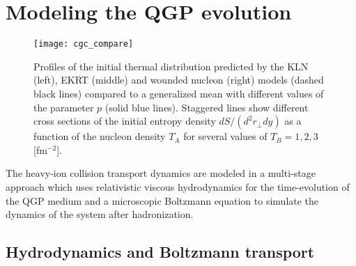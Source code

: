 \documentclass[aps,prc,reprint,amsmath,nofootinbib]{revtex4-1}
\begin{document}
\section{Modeling the QGP evolution}

\begin{figure*}
    \texttt{[image: cgc\_compare]}
    \caption{Profiles of the initial thermal distribution predicted by the KLN (left), EKRT (middle) and wounded nucleon (right) models (dashed black lines) compared to a generalized mean with different values of the parameter $p$ (solid blue lines).
    Staggered lines show different cross sections of the initial entropy density $dS/(d^2r_\perp dy)$ as a function of the nucleon density $T_A$ for several values of $T_B = 1, 2, 3$ [fm$^{-2}$].} 
\end{figure*}

The heavy-ion collision transport dynamics are modeled in a multi-stage approach which uses relativistic viscous hydrodynamics for the time-evolution of the QGP medium and a microscopic Boltzmann equation to simulate the dynamics of the system after hadronization. 

\subsection{Hydrodynamics and Boltzmann transport}
\end{document}
